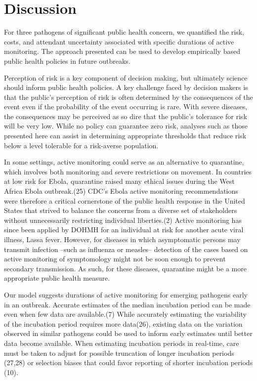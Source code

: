 \documentclass[]{article}
\begin{document}
\section{Discussion}\label{discussion}

For three pathogens of significant public health concern, we quantified
the risk, costs, and attendant uncertainty associated with specific
durations of active monitoring. The approach presented can be used to
develop empirically based public health policies in future outbreaks.

Perception of risk is a key component of decision making, but ultimately
science should inform public health policies. A key challenge faced by
decision makers is that the public's perception of risk is often
determined by the consequences of the event even if the probability of
the event occurring is rare. With severe diseases, the consequences may
be perceived as so dire that the public's tolerance for risk will be
very low. While no policy can guarantee zero risk, analyses such as
those presented here can assist in determining appropriate thresholds
that reduce risk below a level tolerable for a risk-averse population.

In some settings, active monitoring could serve as an alternative to
quarantine, which involves both monitoring and severe restrictions on
movement. In countries at low risk for Ebola, quarantine raised many
ethical issues during the West Africa Ebola outbreak.(25) CDC's Ebola
active monitoring recommendations were therefore a critical cornerstone
of the public health response in the United States that strived to
balance the concerns from a diverse set of stakeholders without
unnecessarily restricting individual liberties.(2) Active monitoring has
since been applied by DOHMH for an individual at risk for another acute
viral illness, Lassa fever. However, for diseases in which asymptomatic
persons may transmit infection --such as influenza or measles--
detection of the cases based on active monitoring of symptomology might
not be soon enough to prevent secondary transmission. As such, for these
diseases, quarantine might be a more appropriate public health measure.

Our model suggests durations of active monitoring for emerging pathogens
early in an outbreak. Accurate estimates of the median incubation period
can be made even when few data are available.(7) While accurately
estimating the variability of the incubation period requires more
data(26), existing data on the variation observed in similar pathogens
could be used to inform early estimates until better data become
available. When estimating incubation periods in real-time, care must be
taken to adjust for possible truncation of longer incubation periods
(27,28) or selection biases that could favor reporting of shorter
incubation periods (10).
\end{document}
